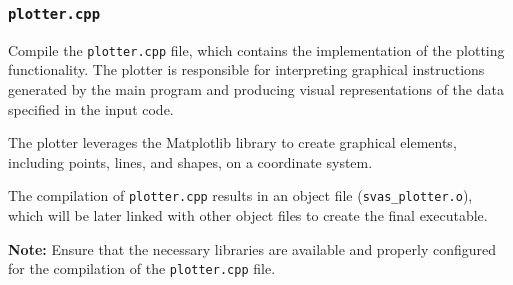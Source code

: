 \documentclass{article}
\begin{document}
\subsubsection{\texttt{plotter.cpp}}
Compile the \texttt{plotter.cpp} file, which contains the implementation of the plotting functionality. The plotter is responsible for interpreting graphical instructions generated by the main program and producing visual representations of the data specified in the input code.

The plotter leverages the Matplotlib library to create graphical elements, including points, lines, and shapes, on a coordinate system.

The compilation of \texttt{plotter.cpp} results in an object file (\texttt{svas\_plotter.o}), which will be later linked with other object files to create the final executable.

\textbf{Note:} Ensure that the necessary libraries are available and properly configured for the compilation of the \texttt{plotter.cpp} file.
\end{document}
